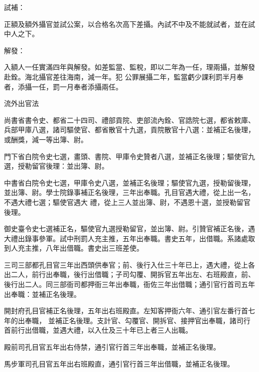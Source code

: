 \begin{pinyinscope}
 試補：



 正額及額外攝官並試公案，以合格名次高下差攝。內試不中及不能就試者，並在試中人之下。



 解發：



 入額人一任實滿四年與解發。如差監當、監稅，即以二年為一任，理兩攝，並解發赴銓。海北攝官差往海南，減一年。犯
 公罪展攝二年，監當虧少課利罰半月奉者，添攝一任，罰一月奉者添攝兩任。



 流外出官法



 尚書省書令史、都省二十四司、禮部貢院、吏部流內銓、官誥院七選，都省敕庫、兵部甲庫八選，諸司驅使官、都省散官十九選，貢院散官十八選：並補正名後理，或酬獎，減一等出簿、尉。



 門下省白院令史七選，畫頭、書院、甲庫令史贊者八選，並補正名後理；驅使官九選，授勒留官後理：並出簿、尉。



 中書省白院令史七選，甲庫令史八選，並補正名後理；驅使官九選，授勒留後理，並出簿、尉。學士院錄事補正名後理，三年出奉職。孔目官遇大禮，從上出一名，不遇大禮七選；驅使官遇大
 禮，從上三人並出簿、尉，不遇恩十選，並授勒留官後理。



 御史臺令史七選補正名，驅使官九選授勒留官，並出簿、尉。引贊官補正名後，遇大禮出錄事參軍。試中刑罰人充主推，五年出奉職。書史五年，出借職。系諸處取到人充主推，八年出借職。書史出三班差使。



 三司三部都孔目官三年出西頭供奉官；前、後行入仕三十年已上，遇大禮，從上各出二人，前行出奉職，後行出借職；子司勾覆、開拆官五年出左、右班殿直，前、後行出二人。同三部衙司都押衙三年出奉職，衙佐三年出借職；通引官行首司五年出奉職：並補正名後理。



 開封府孔目官補正名後理，五年出右班殿直。左知客押衙六年、通引官左番行首七年的出奉職，
 並補正名後理。支計官、勾覆官、開拆官、接押官出奉職，諸司行首前行出借職，並遇大禮，以入仕及三十年已上者三人出職。



 殿前司孔目官五年出右侍禁，通引官行首三年出奉職，並補正名後理。



 馬步軍司孔目官五年出右班殿直，通引官行首三年出借職，並補正名後理。




\end{pinyinscope}
